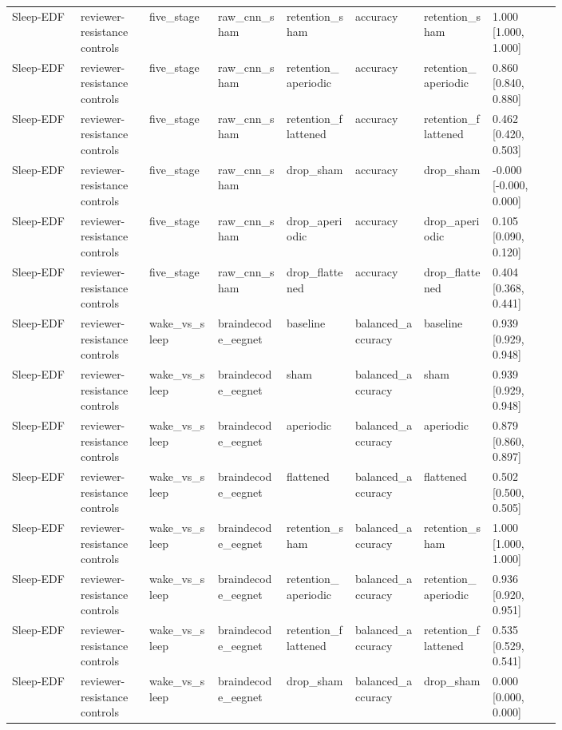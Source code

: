 \begin{longtable}{p{0.10\linewidth}p{0.10\linewidth}p{0.10\linewidth}p{0.10\linewidth}p{0.10\linewidth}p{0.10\linewidth}p{0.10\linewidth}p{0.10\linewidth}}
Sleep-EDF & reviewer-resistance controls & five\_stage & raw\_cnn\_sham & retention\_sham & accuracy & retention\_sham & 1.000 [1.000, 1.000]\\
Sleep-EDF & reviewer-resistance controls & five\_stage & raw\_cnn\_sham & retention\_aperiodic & accuracy & retention\_aperiodic & 0.860 [0.840, 0.880]\\
Sleep-EDF & reviewer-resistance controls & five\_stage & raw\_cnn\_sham & retention\_flattened & accuracy & retention\_flattened & 0.462 [0.420, 0.503]\\
Sleep-EDF & reviewer-resistance controls & five\_stage & raw\_cnn\_sham & drop\_sham & accuracy & drop\_sham & -0.000 [-0.000, 0.000]\\
Sleep-EDF & reviewer-resistance controls & five\_stage & raw\_cnn\_sham & drop\_aperiodic & accuracy & drop\_aperiodic & 0.105 [0.090, 0.120]\\
Sleep-EDF & reviewer-resistance controls & five\_stage & raw\_cnn\_sham & drop\_flattened & accuracy & drop\_flattened & 0.404 [0.368, 0.441]\\
Sleep-EDF & reviewer-resistance controls & wake\_vs\_sleep & braindecode\_eegnet & baseline & balanced\_accuracy & baseline & 0.939 [0.929, 0.948]\\
Sleep-EDF & reviewer-resistance controls & wake\_vs\_sleep & braindecode\_eegnet & sham & balanced\_accuracy & sham & 0.939 [0.929, 0.948]\\
Sleep-EDF & reviewer-resistance controls & wake\_vs\_sleep & braindecode\_eegnet & aperiodic & balanced\_accuracy & aperiodic & 0.879 [0.860, 0.897]\\
Sleep-EDF & reviewer-resistance controls & wake\_vs\_sleep & braindecode\_eegnet & flattened & balanced\_accuracy & flattened & 0.502 [0.500, 0.505]\\
Sleep-EDF & reviewer-resistance controls & wake\_vs\_sleep & braindecode\_eegnet & retention\_sham & balanced\_accuracy & retention\_sham & 1.000 [1.000, 1.000]\\
Sleep-EDF & reviewer-resistance controls & wake\_vs\_sleep & braindecode\_eegnet & retention\_aperiodic & balanced\_accuracy & retention\_aperiodic & 0.936 [0.920, 0.951]\\
Sleep-EDF & reviewer-resistance controls & wake\_vs\_sleep & braindecode\_eegnet & retention\_flattened & balanced\_accuracy & retention\_flattened & 0.535 [0.529, 0.541]\\
Sleep-EDF & reviewer-resistance controls & wake\_vs\_sleep & braindecode\_eegnet & drop\_sham & balanced\_accuracy & drop\_sham & 0.000 [0.000, 0.000]\\

\end{longtable}
